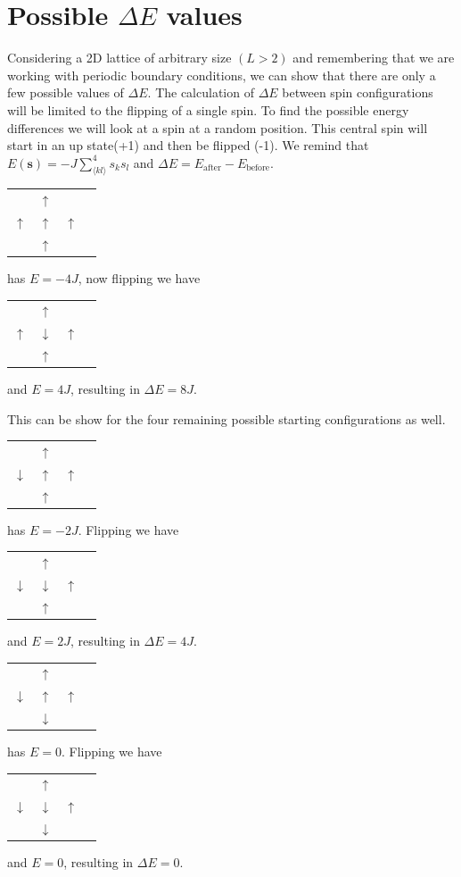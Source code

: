 \documentclass[english,notitlepage,reprint,nofootinbib]{revtex4-1}  %
\begin{document}
\section{Possible $\Delta E$ values}\label{appendix:delta_E}
Considering a 2D lattice of arbitrary size $(L>2)$ and remembering that we are working with periodic boundary conditions, we can show that there are only a few possible values of $\Delta E$. The calculation of $\Delta E$ between spin configurations will be limited to the flipping of a single spin. To find the possible energy differences we will look at a spin at a random position. This central spin will start in an up state(+1) and then be flipped (-1). We remind that $ E(\textbf{s}) = - J \sum^4_{\langle kl \rangle} s_k s_l$ and $ \Delta E = E_{\text{after}} - E_{\text{before}}$.
\begin{table}[H]
\begin{tabular}{llll}
   & $\uparrow$ &    \\
$\uparrow$ & $\uparrow$ & $\uparrow$ \\
   & $\uparrow$ &  
\end{tabular}
has $E = -4J$, now flipping we have 
\begin{tabular}{llll}
    & $\uparrow$ &    \\
 $\uparrow$ & $\downarrow$ & $\uparrow$ \\
    & $\uparrow$ &  
 \end{tabular}
 and $E = 4J$, resulting in $\Delta E = 8J$.
\end{table}
This can be show for the four remaining possible starting configurations as well.
\begin{table}[H]
    \begin{tabular}{llll}
       & $\uparrow$ &    \\
    $\downarrow$ & $\uparrow$ & $\uparrow$ \\
       & $\uparrow$ &  
    \end{tabular}
    has $E = -2J$. Flipping we have 
    \begin{tabular}{llll}
        & $\uparrow$ &    \\
     $\downarrow$ & $\downarrow$ & $\uparrow$ \\
        & $\uparrow$ &  
     \end{tabular}
     and $E = 2J$, resulting in $\Delta E = 4J$.
\end{table}
    
\begin{table}[H]
    \begin{tabular}{llll}
       & $\uparrow$ &    \\
    $\downarrow$ & $\uparrow$ & $\uparrow$ \\
       & $\downarrow$ &  
    \end{tabular}
    has $E = 0$. Flipping we have 
    \begin{tabular}{llll}
        & $\uparrow$ &    \\
     $\downarrow$ & $\downarrow$ & $\uparrow$ \\
        & $\downarrow$ &  
     \end{tabular}
     and $E = 0$, resulting in $\Delta E = 0$.
\end{table}
\end{document}
